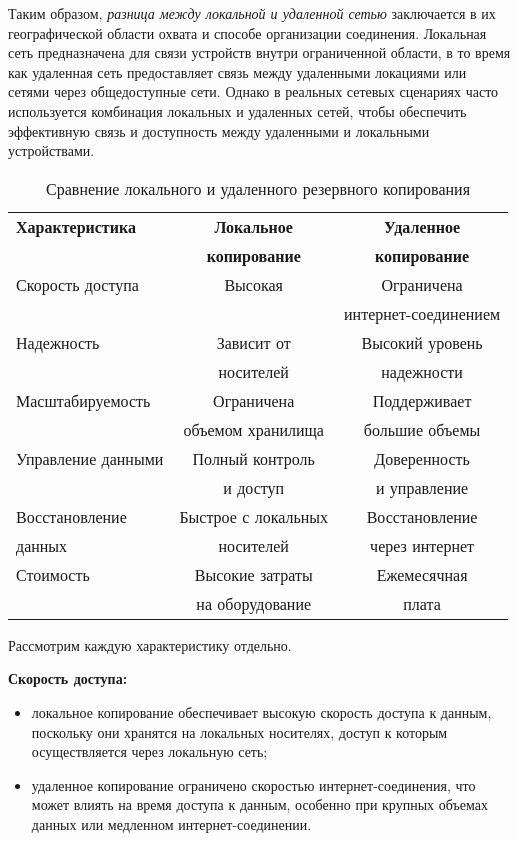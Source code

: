 Таким образом, \textit{разница между локальной и удаленной сетью} заключается в их географической области охвата и способе организации соединения. Локальная сеть предназначена для связи устройств внутри ограниченной области, в то время как удаленная сеть предоставляет связь между удаленными локациями или сетями через общедоступные сети. Однако в реальных сетевых сценариях часто используется комбинация локальных и удаленных сетей, чтобы обеспечить эффективную связь и доступность между удаленными и локальными устройствами.

\begin{table}[h]
  \centering
  \caption{Сравнение локального и удаленного резервного копирования}
  \begin{tabular}{|l|c|c|}
    \hline
    \textbf{Характеристика} & \textbf{Локальное} & \textbf{Удаленное} \\
    & \textbf{копирование} & \textbf{копирование} \\
    \hline
    Скорость доступа & Высокая & Ограничена \\
     & & интернет-соединением \\
    \hline
    Надежность & Зависит от & Высокий уровень \\
     & носителей & надежности \\
    \hline
    Масштабируемость & Ограничена & Поддерживает \\
     & объемом хранилища & большие объемы \\
    \hline
    Управление данными & Полный контроль & Доверенность \\
     & и доступ & и управление \\
    \hline
    Восстановление & Быстрое с локальных & Восстановление \\
    данных & носителей & через интернет \\
    \hline
    Стоимость & Высокие затраты & Ежемесячная \\
     & на оборудование & плата \\
  	\hline
  \end{tabular}
\end{table}

Рассмотрим каждую характеристику отдельно.
\begin{flushleft}
\textbf{Скорость доступа:}
\end{flushleft}

\begin{itemize}
\item локальное копирование обеспечивает высокую скорость доступа к данным, поскольку они хранятся на локальных носителях, доступ к которым осуществляется через локальную сеть;
\item удаленное копирование ограничено скоростью интернет-соединения, что может влиять на время доступа к данным, особенно при крупных объемах данных или медленном интернет-соединении.
\end{itemize}

